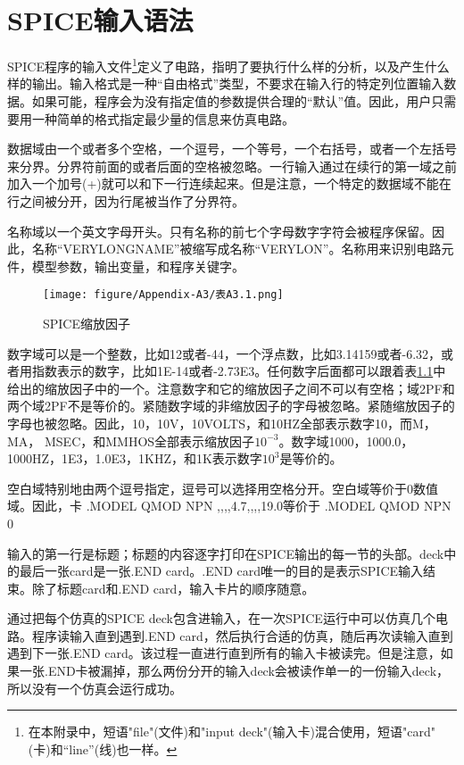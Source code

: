 \chapter{SPICE输入语法}
\label{App:3}

SPICE程序的输入文件\footnote{在本附录中，短语"file"(文件)和"input deck"(输入卡)混合使用，短语"card"(卡)和“line”(线)也一样。}定义了电路，指明了要执行什么样的分析，以及产生什么样的输出。输入格式是一种“自由格式”类型，不要求在输入行的特定列位置输入数据。如果可能，程序会为没有指定值的参数提供合理的“默认”值。因此，用户只需要用一种简单的格式指定最少量的信息来仿真电路。

数据域由一个或者多个空格，一个逗号，一个等号，一个右括号，或者一个左括号来分界。分界符前面的或者后面的空格被忽略。一行输入通过在续行的第一域之前加入一个加号(+)就可以和下一行连续起来。但是注意，一个特定的数据域不能在行之间被分开，因为行尾被当作了分界符。

名称域以一个英文字母开头。只有名称的前七个字母数字字符会被程序保留。因此，名称“VERYLONGNAME”被缩写成名称“VERYLON”。名称用来识别电路元件，模型参数，输出变量，和程序关键字。

\begin{figure}[htbp]
\small
    \centering
    \texttt{[image: figure/Appendix-A3/表A3.1.png]}
    \caption{SPICE缩放因子}
    \label{表A3.1}
\end{figure}

数字域可以是一个整数，比如12或者-44，一个浮点数，比如3.14159或者-6.32，或者用指数表示的数字，比如1E-14或者-2.73E3。任何数字后面都可以跟着表\ref{表A3.1}中给出的缩放因子中的一个。注意数字和它的缩放因子之间不可以有空格；域2PF和两个域2\quad PF不是等价的。紧随数字域的非缩放因子的字母被忽略。紧随缩放因子的字母也被忽略。因此，10，10V，10VOLTS，和10HZ全部表示数字10，而M， MA， MSEC，和MMHOS全部表示缩放因子$10^{-3}$。数字域1000，1000.0，1000HZ，1E3，1.0E3，1KHZ，和1K表示数字$10^{3}$是等价的。

空白域特别地由两个逗号指定，逗号可以选择用空格分开。空白域等价于0数值域。因此，卡
.MODEL QMOD NPN ,,\quad,\quad,4.7,,,\quad,19.0等价于
.MODEL QMOD NPN 0

输入的第一行是标题；标题的内容逐字打印在SPICE输出的每一节的头部。deck中的最后一张card是一张.END card。.END card唯一的目的是表示SPICE输入结束。除了标题card和.END card，输入卡片的顺序随意。

通过把每个仿真的SPICE deck包含进输入，在一次SPICE运行中可以仿真几个电路。程序读输入直到遇到.END card，然后执行合适的仿真，随后再次读输入直到遇到下一张.END card。该过程一直进行直到所有的输入卡被读完。但是注意，如果一张.END卡被漏掉，那么两份分开的输入deck会被读作单一的一份输入deck，所以没有一个仿真会运行成功。

